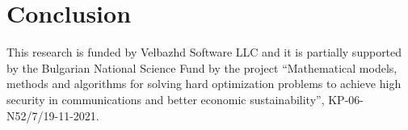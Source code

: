 \documentclass{ifacconf}
\begin{document}
\subsection{}

\section{Conclusion}

\begin{ack}
This research is funded by Velbazhd Software LLC and it is partially supported by the Bulgarian National Science Fund by the project “Mathematical models, methods and algorithms for solving hard optimization problems to achieve high security in communications and better economic sustainability”, KP-06-N52/7/19-11-2021.
\end{ack}

            
\end{document}
